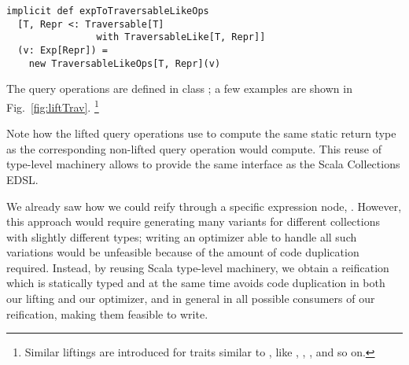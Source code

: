 \begin{lstlisting}
implicit def expToTraversableLikeOps
  [T, Repr <: Traversable[T]
                with TraversableLike[T, Repr]]
  (v: Exp[Repr]) =
    new TraversableLikeOps[T, Repr](v)
\end{lstlisting}

The query operations are defined in class ; a few examples are shown in Fig.~\ref{fig:liftTrav}.%
\footnote{Similar liftings are introduced for traits similar to , like , , , and so on.}

Note how the lifted query operations use  to compute the same static return type as the corresponding non-lifted query operation would compute. This reuse of type-level machinery allows {\LoS} to provide the same interface as the Scala Collections EDSL.

We already saw how we could reify  through a specific expression node, . However, this approach would require generating many variants for different collections with slightly different types; writing an optimizer able to handle all such variations would be unfeasible because of the amount of code duplication required.
Instead, by reusing Scala type-level machinery, we obtain a reification which is statically typed and at the same time avoids code duplication in both our lifting and our optimizer, and in general in all possible consumers of our reification, making them feasible to write.



